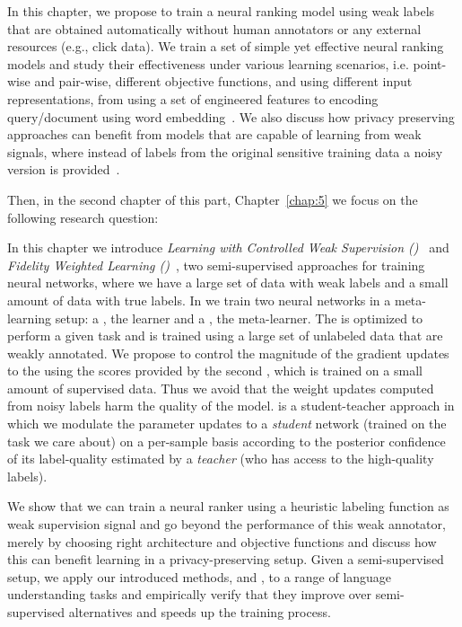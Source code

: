 In this chapter, we propose to train a neural ranking model using weak labels that are obtained automatically without human annotators or any external resources (e.g., click data). We train a set of simple yet effective neural ranking models and study their effectiveness under various learning scenarios, i.e. point-wise and pair-wise, different objective functions, and using different input representations, from using a set of engineered features to encoding query/document using word embedding~\citep{Dehghani:2017:SIGIR}. We also discuss how privacy preserving approaches can benefit from models that are capable of learning from weak signals, where instead of labels from the original sensitive training data a noisy version is provided~\citep{dehghani:2017:neuir}.

Then, in the second chapter of this part, Chapter~\ref{chap:5} we focus on the following research question:

In this chapter we introduce \emph{Learning with Controlled Weak Supervision (\cws)}~\cite{Dehghani:2017:nips_metalearn, Dehghani:2017avoiding} and \emph{Fidelity Weighted Learning (\fwl)}~\citep{dehghani:2018:ICLR}, two semi-supervised approaches for training neural networks, where we have a large set of data with weak labels and a small amount of data with true labels. 
%
In \cws we train two neural networks in a meta-learning setup: a \tnet, the learner and a \cnet, the meta-learner.  The \tnet is optimized to perform a given task and is trained using a large set of unlabeled data that are weakly annotated. We propose to control the magnitude of the gradient updates to the \tnet using the scores provided by the second \cnet, which is trained on a small amount of supervised data. Thus we avoid that the weight updates computed from noisy labels harm the quality of the \tnet model.
%
\fwl is a student-teacher approach in which we modulate the parameter updates to a \emph{student} network (trained on the task we care about) on a per-sample basis according to the posterior confidence of its label-quality estimated by a \emph{teacher} (who has access to the high-quality labels).  


We show that we can train a neural ranker using a heuristic labeling function as weak supervision signal and go beyond the performance of this weak annotator, merely by choosing right architecture and objective functions and discuss how this can benefit learning in a privacy-preserving setup.
Given a semi-supervised setup, we apply our introduced methods, \cws and \fwl, to a range of language understanding tasks and empirically verify that they improve over semi-supervised alternatives and speeds up the training process. 

\medskip

% 
% 